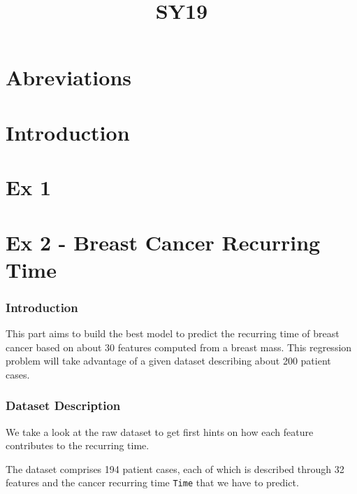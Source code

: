 \documentclass[]{report}
\title{SY19}
\author{}
\begin{document}
	

\maketitle

\part{Abreviations}
	

\begin{abstract}

\end{abstract}

\part{Introduction}

\part{Ex 1}

\part{Ex 2 - Breast Cancer Recurring Time}

\section{Introduction}
This part aims to build the best model to predict the recurring time of breast cancer based on about 30 features computed from a breast mass.  This regression problem will take advantage of a given dataset describing about 200 patient cases.

\section{Dataset Description}
We take a look at the raw dataset to get first hints on how each feature contributes to the recurring time.

The dataset comprises 194 patient cases, each of which is described through 32 features and the cancer recurring time \texttt{Time} that we have to predict.
\end{document}
